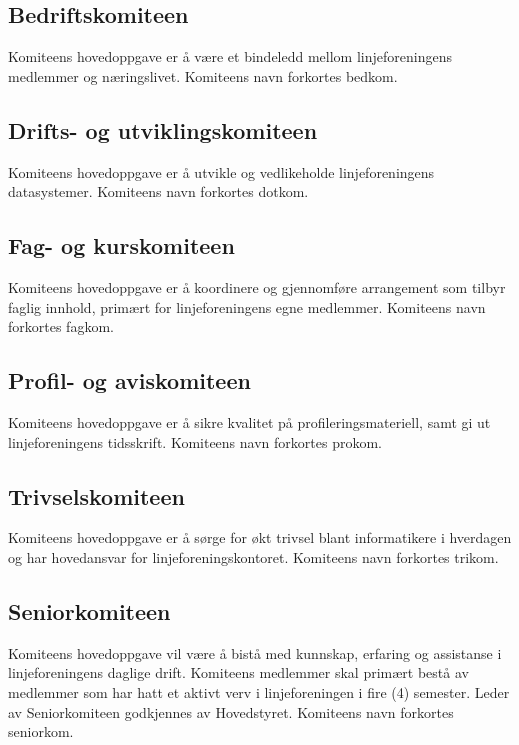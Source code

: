 \vspace{-10pt}
\subsection{Bedriftskomiteen}{
Komiteens hovedoppgave er å være et bindeledd mellom linjeforeningens medlemmer og næringslivet. Komiteens navn forkortes bedkom.
}

\vspace{-10pt}
\subsection{Drifts- og utviklingskomiteen}{
Komiteens hovedoppgave er å utvikle og vedlikeholde linjeforeningens datasystemer. Komiteens navn forkortes dotkom.

}

\vspace{-10pt}
\subsection{Fag- og kurskomiteen}{
Komiteens hovedoppgave er å koordinere og gjennomføre arrangement som tilbyr faglig innhold, primært for linjeforeningens egne medlemmer. Komiteens navn forkortes fagkom.
}

\vspace{-10pt}
\subsection{Profil- og aviskomiteen}{
Komiteens hovedoppgave er å sikre kvalitet på profileringsmateriell, samt gi ut linjeforeningens tidsskrift. Komiteens navn forkortes prokom.
}

\vspace{-10pt}
\subsection{Trivselskomiteen}{
Komiteens hovedoppgave er å sørge for økt trivsel blant informatikere i hverdagen og har hovedansvar for linjeforeningskontoret. Komiteens navn forkortes trikom.
}

\vspace{-10pt}
\subsection{Seniorkomiteen}{
Komiteens hovedoppgave vil være å bistå med kunnskap, erfaring og assistanse i linjeforeningens daglige drift. Komiteens medlemmer skal primært bestå av medlemmer som har hatt et aktivt verv i linjeforeningen i fire (4) semester. Leder av Seniorkomiteen godkjennes av Hovedstyret. Komiteens navn forkortes seniorkom.
}

